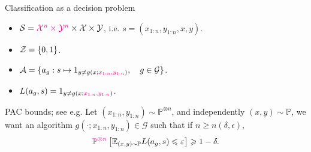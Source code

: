 \documentclass[10pt]{beamer}
\begin{document}

\begin{frame}{Classification as a decision problem}
\begin{itemize}
\item $\mathcal{S} = \textcolor{magenta}{\mathcal{X}^n\times\mathcal{Y}^n}\times \mathcal{X}\times \mathcal{Y}$, i.e. $s = (x_{1:n}, y_{1:n}, x, y)$.
\item $\mathcal{Z} = \{0,1\}$.
\item $\mathcal{A} = \{a_g: s\mapsto 1_{y\neq g(x; \textcolor{magenta}{x_{1:n}, y_{1:n}})}, \quad g\in\mathcal{G}\}$.
\item $L(a_g,s) = 1_{y\neq g(x; \textcolor{magenta}{x_{1:n}, y_{1:n}})}$.
\end{itemize}
\vfill
\begin{block}{PAC bounds; see e.g. \citep{ShBe14}}
Let $(x_{1:n},y_{1:n})\sim \mathbb{P}^{\otimes n}$, and independently $(x,y)\sim \mathbb{P}$, we want an algorithm $g(\cdot; x_{1:n}, y_{1:n})\in\mathcal G$ such that if $n\geq n(\delta,\epsilon)$,
$$
\textcolor{magenta}{\mathbb{P}^{\otimes n}}\left[\mathbb{E}_{(x,y)\sim \mathbb P} L(a_g,s) \leqslant \varepsilon\right] \geqslant 1-\delta.
$$
\end{block}\end{frame}


\end{document}
